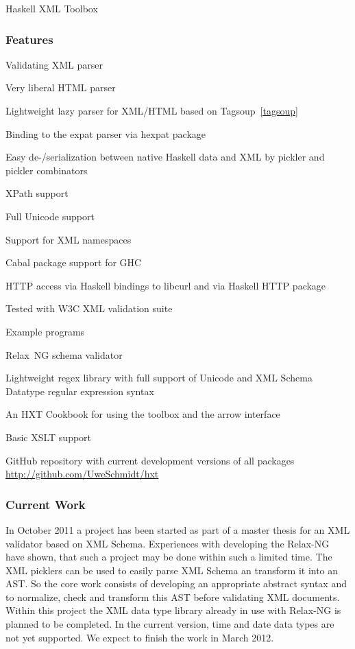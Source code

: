 \begin{hcarentry}[updated]{Haskell XML Toolbox}
\subsubsection*{Features}

\begin{compactitem}
\item Validating XML parser
\item Very liberal HTML parser
\item Lightweight lazy parser for XML/HTML based on Tagsoup~\cref{tagsoup}
\item Binding to the expat parser via hexpat package
\item Easy de-/serialization between native Haskell data and XML by pickler and pickler combinators
\item XPath support
\item Full Unicode support
\item Support for XML namespaces
\item Cabal package support for GHC
\item HTTP access via Haskell bindings to libcurl and via Haskell HTTP
  package
\item Tested with W3C XML validation suite
\item Example programs
\item Relax~NG schema validator
\item Lightweight regex library with full support of Unicode and XML Schema
  Datatype regular expression syntax
\item An HXT Cookbook for using the toolbox and the arrow interface
\item Basic XSLT support
\item GitHub repository with current development versions of all packages
  \url{http://github.com/UweSchmidt/hxt}
\end{compactitem}

\subsubsection*{Current Work}

In October 2011 a project has been started as part of a master thesis
for an XML validator based on XML Schema. Experiences with developing
the Relax-NG have shown, that such a project may be done within such a limited
time. The XML picklers can be used to easily parse XML Schema an transform it
into an AST. So the core work consists of developing an appropriate abstract
syntax and to normalize, check and transform this AST before validating XML documents.
Within this project the XML data type library already in use with Relax-NG is planned
to be completed. In the current version, time and date data types are not yet supported.
We expect to finish the work in March 2012.


\end{hcarentry}
